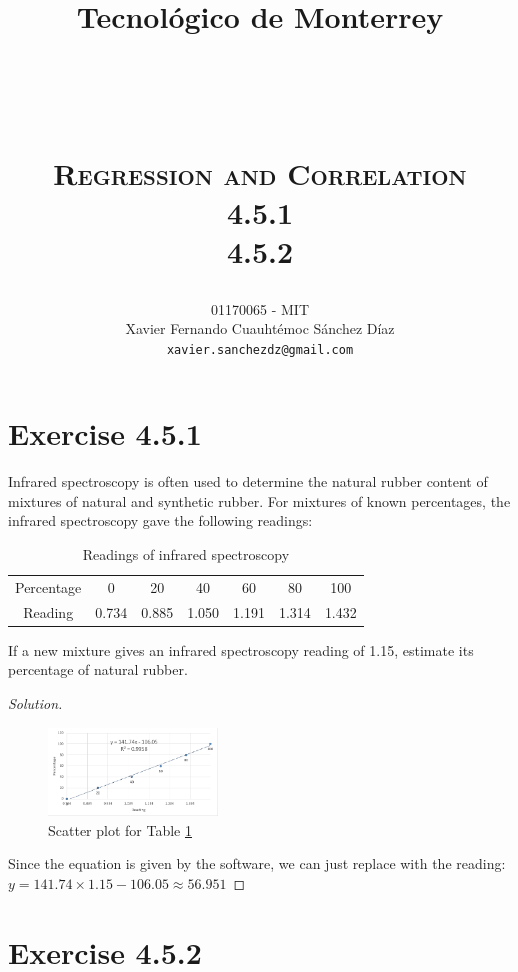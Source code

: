 \documentclass[titlepage, letterpaper, fleqn]{article}
\title{
\vspace{1in}
\textbf{Tecnológico de Monterrey} \\
\vspace{0.5in}
\textmd{\mahclass} \\
\large{\textit{\mahteacher}} \\
\vspace{0.5in}
\textsc{\mahtitle}\\
\textsc{Regression and Correlation}\\
\textsc{4.5.1}\\
\textsc{4.5.2}\\
\author{01170065  - MIT \\
Xavier Fernando Cuauhtémoc Sánchez Díaz \\
\texttt{xavier.sanchezdz@gmail.com}}
\date{\mahdate}
}
\renewcommand\qedsymbol{\(\blacksquare\)}
\newenvironment{solution}
{\renewcommand\qedsymbol{$\square$}\begin{proof}[Solution]}
{\end{proof}}
\begin{document}
\begin{titlepage}
\maketitle
\end{titlepage}

%
%

\section{Exercise 4.5.1}

{\large Infrared spectroscopy is often used to determine the natural rubber content of mixtures of natural and synthetic rubber.
For mixtures of known percentages, the infrared spectroscopy gave the following readings:}

\begin{table}[h!]
\centering
\begin{tabular}{@{}ccccccc@{}}
\toprule
Percentage & 0 & 20 & 40 & 60 & 80 & 100 \\
Reading & 0.734 & 0.885 & 1.050 & 1.191 & 1.314 & 1.432 \\ \bottomrule
\end{tabular}
\caption{Readings of infrared spectroscopy}
\label{tab4.5.1}
\end{table}

{\large If a new mixture gives an infrared spectroscopy reading of 1.15, estimate its percentage of natural rubber.}

\begin{solution}
\begin{figure}[h!]
	\centering
	\includegraphics[width=0.4\textwidth]{img_4_5_1}
	\caption{Scatter plot for Table \ref{tab4.5.1}}
	\label{fig:4.5.1}
\end{figure}
Since the equation is given by the software, we can just replace with the reading: $y = 141.74 \times 1.15 - 106.05 \approx 56.951$
\end{solution}

\pagebreak

\section{Exercise 4.5.2}
\end{document}
